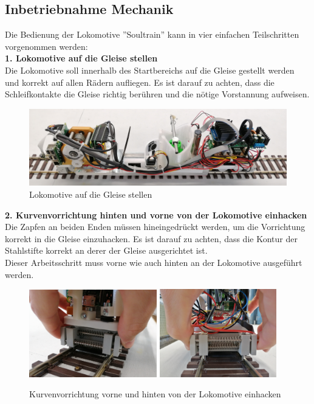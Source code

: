 \documentclass[../../main.tex]{subfiles}
\begin{document}
\subsection{Inbetriebnahme Mechanik}

Die Bedienung der Lokomotive ''Soultrain'' kann in vier einfachen Teilschritten vorgenommen werden:\\

\textbf{1. Lokomotive auf die Gleise stellen}\\
Die Lokomotive soll innerhalb des Startbereichs auf die Gleise gestellt werden und korrekt auf allen Rädern aufliegen.
Es ist darauf zu achten, dass die Schleifkontakte die Gleise richtig berühren und die nötige Vorstannung aufweisen.

\begin{figure}[H]
  \centering
  \includegraphics[width=1\textwidth]{montagezug.PNG}
  \caption {Lokomotive auf die Gleise stellen}
  \label{fig:montagezug}
\end{figure}

\textbf{2. Kurvenvorrichtung hinten und vorne von der Lokomotive einhacken}\\
Die Zapfen an beiden Enden müssen hineingedrückt werden, um die Vorrichtung korrekt in die Gleise einzuhacken. Es ist darauf zu achten, dass die Kontur der Stahlstifte korrekt an derer der Gleise ausgerichtet ist.\\
Dieser Arbeitsschritt muss vorne wie auch hinten an der Lokomotive ausgeführt werden.

\begin{figure}[H]
  \centering
  \includegraphics[width=0.495\textwidth]{../../images/Maschinentechnik/montagevorne.PNG}
  \includegraphics[width=0.455\textwidth]{../../images/Maschinentechnik/montagehinten.PNG}
  \caption {Kurvenvorrichtung vorne und hinten von der Lokomotive einhacken}
\end{figure}
\end{document}
